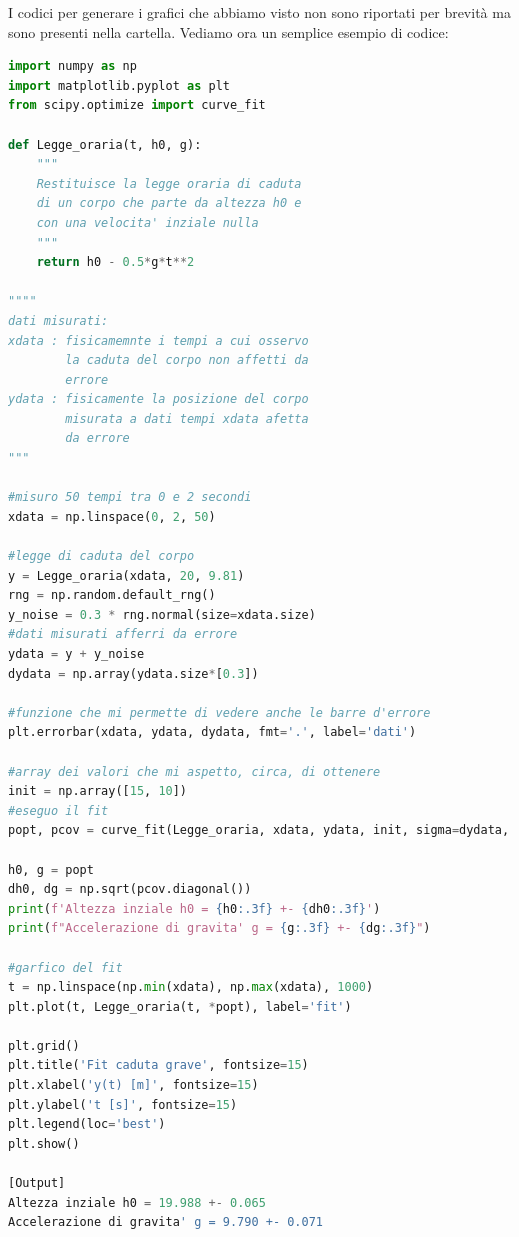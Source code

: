 \documentclass[10pt,a4paper]{article}
\begin{document}
I codici per generare i grafici che abbiamo visto non sono riportati per brevità ma sono presenti nella cartella.
Vediamo ora un semplice esempio di codice:

\begin{lstlisting}[language=Python]
import numpy as np
import matplotlib.pyplot as plt
from scipy.optimize import curve_fit

def Legge_oraria(t, h0, g):
    """
    Restituisce la legge oraria di caduta
    di un corpo che parte da altezza h0 e
    con una velocita' inziale nulla
    """
    return h0 - 0.5*g*t**2

""""
dati misurati:
xdata : fisicamemnte i tempi a cui osservo
        la caduta del corpo non affetti da
        errore
ydata : fisicamente la posizione del corpo
        misurata a dati tempi xdata afetta
        da errore
"""

#misuro 50 tempi tra 0 e 2 secondi
xdata = np.linspace(0, 2, 50)

#legge di caduta del corpo
y = Legge_oraria(xdata, 20, 9.81)
rng = np.random.default_rng()
y_noise = 0.3 * rng.normal(size=xdata.size)
#dati misurati afferri da errore
ydata = y + y_noise
dydata = np.array(ydata.size*[0.3])

#funzione che mi permette di vedere anche le barre d'errore
plt.errorbar(xdata, ydata, dydata, fmt='.', label='dati')

#array dei valori che mi aspetto, circa, di ottenere
init = np.array([15, 10])
#eseguo il fit
popt, pcov = curve_fit(Legge_oraria, xdata, ydata, init, sigma=dydata, absolute_sigma=False)

h0, g = popt
dh0, dg = np.sqrt(pcov.diagonal())
print(f'Altezza inziale h0 = {h0:.3f} +- {dh0:.3f}')
print(f"Accelerazione di gravita' g = {g:.3f} +- {dg:.3f}")

#garfico del fit
t = np.linspace(np.min(xdata), np.max(xdata), 1000)
plt.plot(t, Legge_oraria(t, *popt), label='fit')

plt.grid()
plt.title('Fit caduta grave', fontsize=15)
plt.xlabel('y(t) [m]', fontsize=15)
plt.ylabel('t [s]', fontsize=15)
plt.legend(loc='best')
plt.show()

[Output]
Altezza inziale h0 = 19.988 +- 0.065
Accelerazione di gravita' g = 9.790 +- 0.071
\end{lstlisting}
\end{document}
